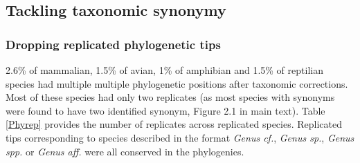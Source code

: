 \documentclass[11pt]{article}
\begin{document}
\subsection{Tackling taxonomic synonymy}


\subsubsection{Dropping replicated phylogenetic tips}
2.6\% of mammalian, 1.5\% of avian, 1\% of amphibian and  1.5\% of reptilian species had multiple multiple phylogenetic positions after taxonomic corrections. Most of these species had only two replicates (as most species with synonyms were found to have two identified synonym, Figure 2.1 in main text). Table \ref{Phyrep} provides the number of replicates across replicated species. Replicated tips corresponding to species described in the format \textit{Genus cf.}, \textit{Genus sp.}, \textit{Genus spp.} or \textit{Genus aff.} were all conserved in the phylogenies.
\end{document}
